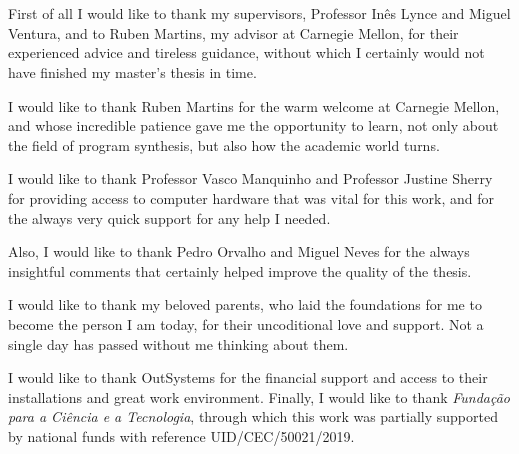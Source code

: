 \section*{\acknowledgments}


First of all I would like to thank my supervisors, Professor Inês Lynce and
Miguel Ventura, and to Ruben Martins, my advisor at Carnegie Mellon, for their
experienced advice and tireless guidance, without which I certainly would not
have finished my master's thesis in time.

I would like to thank Ruben Martins for the warm welcome at Carnegie Mellon, and
whose incredible patience gave me the opportunity to learn, not only about the
field of program synthesis, but also how the academic world turns.

I would like to thank Professor Vasco Manquinho and Professor Justine Sherry for
providing access to computer hardware that was vital for this work, and for the
always very quick support for any help I needed.

Also, I would like to thank Pedro Orvalho and Miguel Neves for the always
insightful comments that certainly helped improve the quality of the thesis.

I would like to thank my beloved parents, who laid the foundations for me to
become the person I am today, for their uncoditional love and support.
Not a single day has passed without me thinking about them.

I would like to thank OutSystems for the financial support and access to their
installations and great work environment.
Finally, I would like to thank \textit{Fundação para a Ciência e a Tecnologia},
through which this work was partially supported by national funds with reference
UID/CEC/50021/2019.

\cleardoublepage
